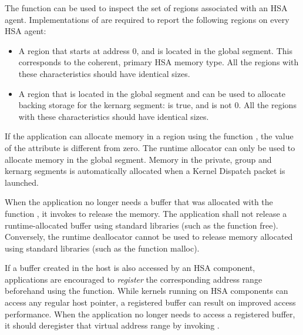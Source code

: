 \documentclass[final,oneside]{book}
\begin{document}
The function  can be used to inspect the set
of regions associated with an HSA agent. Implementations of
 are required to report the following
regions on every HSA agent:
\begin{itemize}[itemsep=1pt,topsep=3pt,partopsep=0pt]
\item A region that starts at address 0, and is located in the global
  segment. This corresponds to the coherent, primary HSA memory type. All the
  regions with these characteristics should have identical sizes.
\item A region that is located in the global segment and can be used to allocate
  backing storage for the kernarg segment:  is
  true, and  is not 0. All the regions
  with these characteristics should have identical sizes.
\end{itemize}

If the application can allocate memory in a region using the function 
, the value of the attribute
 is different from zero. The runtime
allocator can only be used to allocate memory in the global segment. Memory in
the private, group and kernarg segments is automatically allocated when a
Kernel Dispatch packet is launched.

When the application no longer needs a buffer that was allocated with the
function , it invokes  to
release the memory. The application shall not release a runtime-allocated buffer
using standard libraries (such as the function free). Conversely, the runtime
deallocator cannot be used to release memory allocated using standard libraries
(such as the function malloc).

If a buffer created in the host is also accessed by an HSA component,
applications are encouraged to \emph{register} the corresponding address range
beforehand using the  function. While kernels
running on HSA components can access any regular host pointer, a registered
buffer can result on improved access performance.  When the application no
longer needs to access a registered buffer, it should deregister that virtual
address range by invoking .
\end{document}
